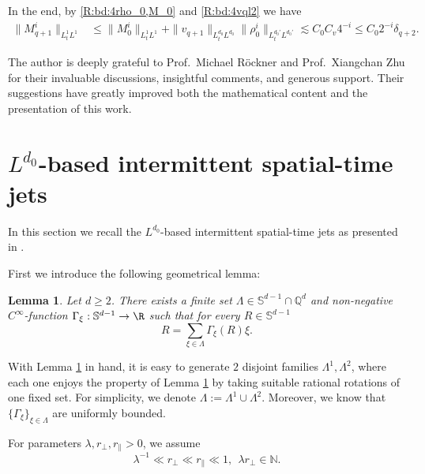 \documentclass[UTF-8,reqno]{amsart}
\numberwithin{equation}{section}
\def\theequation{\arabic{section}.\arabic{equation}}
\newtheorem{lemma}[theorem]{Lemma}
\theoremstyle{definition}
\def\geq{\geqslant}
\def\leq{\leqslant}
\def\bl{\begin{lemma}}
\def\el{\end{lemma}}
\def\geq{\geqslant}
\def\leq{\leqslant}
\begin{document}
In the end,  by \eqref{R:bd:4rho_0,M_0}  and \eqref{R:bd:4vql2} we have  
\begin{align*}
    \|M^{i}_{q+1}\|_{L^1_tL^1}&\leq \|M^{i}_{0}\|_{L^1_tL^1}+\|v_{q+1}\|_{L^{d_0}_tL^{d_0}}\|\rho^{i}_0\|_{L^{d_0'}_tL^{d_0'}} \lesssim C_0 C_v 4^{-i}  \leq C_0 2^{-i}\delta_{q+2}.
\end{align*} 
 

The author is deeply grateful to Prof.~Michael R\"ockner and
Prof.~Xiangchan Zhu for their invaluable discussions, insightful comments, and
generous support. Their suggestions have greatly improved both the mathematical
content and the presentation of this work. 



 
\appendix
 \renewcommand{\appendixname}{Appendix~\Alph{section}}
  \renewcommand{\theequation}{A.\arabic{equation}}


\section{$L^{d_0}$-based  intermittent spatial-time jets}\label{gij}

In this section we recall the $L^{d_0}$-based intermittent spatial-time jets as  presented in  \cite[Appendix C.1]{LRZ25}. 

First we introduce  the following geometrical lemma:
\bl\cite[Lemma 3.1]{BCDL21}\label{lem:cv2}
Let $d\geq2$. There exists a finite set $\Lambda\in \mathbb{S}^{d-1}\cap \mathbb{Q}^d $ and non-negative $C^\infty$-function  $\Gamma_{\xi}:\mathbb{S}^{d-1}\to\R $ such
that for every $R \in \mathbb{S}^{d-1}$
$$R=\sum_{\xi\in\Lambda}\Gamma_\xi(R)\xi.$$
\el
 With Lemma \ref{lem:cv2} in hand,   it is easy to generate $2$ disjoint families $\Lambda^{1},\Lambda^{2}$, where each one enjoys the property of Lemma \ref{lem:cv2} by taking suitable rational rotations of one fixed set. For simplicity, we denote $\Lambda:= \Lambda^{1}\cup\Lambda^{2}$. Moreover, we know that  $\{\Gamma_{\xi}\}_{\xi\in \Lambda }$ are uniformly bounded.


For parameters $\lambda,r_\perp, r_\parallel > 0 $, we assume
$$\lambda^{-1}\ll r_{\perp}\ll r_{\parallel}\ll 1,\ \ \lambda r_{\perp}\in\mathbb{N}.$$

 
\end{document}
